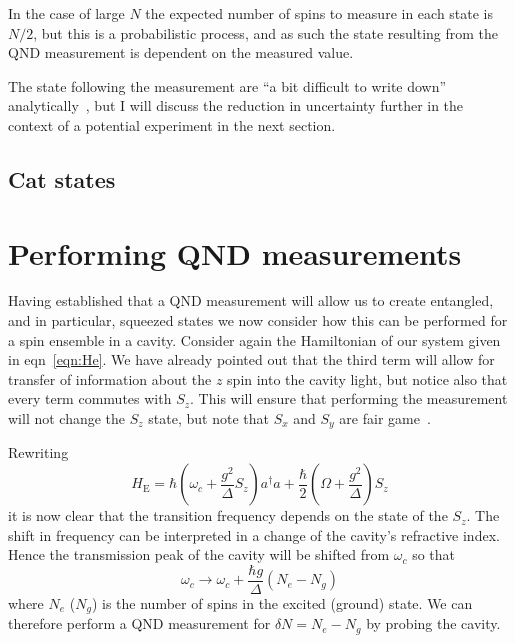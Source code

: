 \documentclass{article}
\begin{document}
In the case of large $N$ the expected number of spins to measure in each state
is $N/2$, but this is a probabilistic process, and as such the state resulting
from the QND measurement is dependent on the measured value.


The state following the measurement are ``a bit difficult to write down''
analytically~\cite{Cox2016}, but I will discuss the reduction in uncertainty
further in the context of a potential experiment in the next section.

\subsection{Cat states}


\section{Performing QND measurements}

Having established that a QND measurement will allow us to create entangled,
and in particular, squeezed states we now consider how this can be performed
for a spin ensemble in a cavity. Consider again the Hamiltonian of our system
given in eqn~\ref{eqn:He}. We have already pointed out that the
third term will allow for transfer of information about the $z$ spin into the
cavity light, but notice also that every term commutes with $S_z$. This will
ensure that performing the measurement will not change the $S_z$ state, but
note that $S_x$ and $S_y$ are fair game~\cite{SchleierSmith2011}.

Rewriting
%
\begin{equation}
  H_\text{E}= 
    \hbar \left(\omega_c + \frac{g^2}{\Delta}S_z\right)a^\dagger a + 
    \frac{\hbar}{2}\left(\Omega + \frac{g^2}{\Delta}\right)S_z
\end{equation}
%
it is now clear that the transition frequency depends on the state of the
$S_z$. The shift in frequency can be interpreted in a change of the cavity's
refractive index. Hence the transmission peak of the cavity will be shifted
from $\omega_c$ so that
%
\begin{equation}
  \omega_c \rightarrow \omega_c + \frac{\hbar g}{\Delta}(N_e - N_g)
\end{equation}
%
where $N_e$ ($N_g$) is the number of spins in the excited (ground) state. We
can therefore perform a QND measurement for $\delta N = N_e - N_g$ by probing
the cavity.
\end{document}
